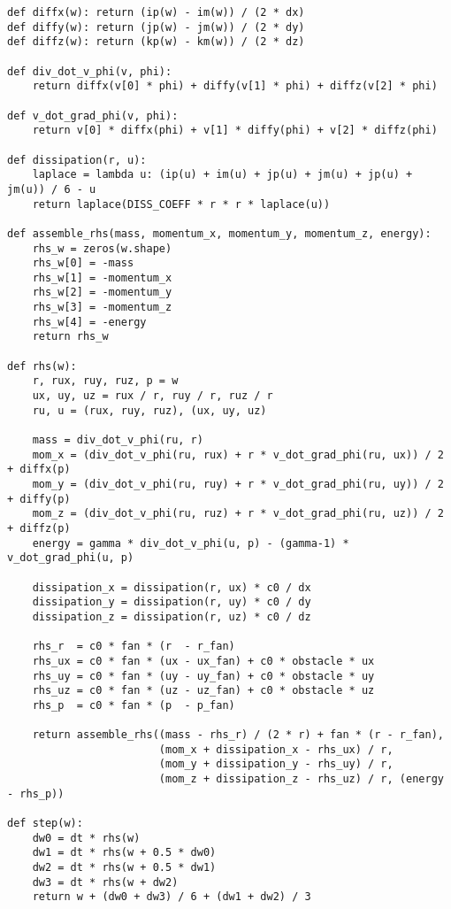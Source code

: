 \documentclass[review]{siamart0216}
\begin{document}
\begin{lstlisting}
def diffx(w): return (ip(w) - im(w)) / (2 * dx)
def diffy(w): return (jp(w) - jm(w)) / (2 * dy)
def diffz(w): return (kp(w) - km(w)) / (2 * dz)

def div_dot_v_phi(v, phi):
    return diffx(v[0] * phi) + diffy(v[1] * phi) + diffz(v[2] * phi)

def v_dot_grad_phi(v, phi):
    return v[0] * diffx(phi) + v[1] * diffy(phi) + v[2] * diffz(phi)

def dissipation(r, u):
    laplace = lambda u: (ip(u) + im(u) + jp(u) + jm(u) + jp(u) + jm(u)) / 6 - u
    return laplace(DISS_COEFF * r * r * laplace(u))

def assemble_rhs(mass, momentum_x, momentum_y, momentum_z, energy):
    rhs_w = zeros(w.shape)
    rhs_w[0] = -mass
    rhs_w[1] = -momentum_x
    rhs_w[2] = -momentum_y
    rhs_w[3] = -momentum_z
    rhs_w[4] = -energy
    return rhs_w

def rhs(w):
    r, rux, ruy, ruz, p = w
    ux, uy, uz = rux / r, ruy / r, ruz / r
    ru, u = (rux, ruy, ruz), (ux, uy, uz)

    mass = div_dot_v_phi(ru, r)
    mom_x = (div_dot_v_phi(ru, rux) + r * v_dot_grad_phi(ru, ux)) / 2 + diffx(p)
    mom_y = (div_dot_v_phi(ru, ruy) + r * v_dot_grad_phi(ru, uy)) / 2 + diffy(p)
    mom_z = (div_dot_v_phi(ru, ruz) + r * v_dot_grad_phi(ru, uz)) / 2 + diffz(p)
    energy = gamma * div_dot_v_phi(u, p) - (gamma-1) * v_dot_grad_phi(u, p)

    dissipation_x = dissipation(r, ux) * c0 / dx
    dissipation_y = dissipation(r, uy) * c0 / dy
    dissipation_z = dissipation(r, uz) * c0 / dz

    rhs_r  = c0 * fan * (r  - r_fan)
    rhs_ux = c0 * fan * (ux - ux_fan) + c0 * obstacle * ux
    rhs_uy = c0 * fan * (uy - uy_fan) + c0 * obstacle * uy
    rhs_uz = c0 * fan * (uz - uz_fan) + c0 * obstacle * uz
    rhs_p  = c0 * fan * (p  - p_fan)

    return assemble_rhs((mass - rhs_r) / (2 * r) + fan * (r - r_fan),
                        (mom_x + dissipation_x - rhs_ux) / r,
                        (mom_y + dissipation_y - rhs_uy) / r,
                        (mom_z + dissipation_z - rhs_uz) / r, (energy - rhs_p))

def step(w):
    dw0 = dt * rhs(w)
    dw1 = dt * rhs(w + 0.5 * dw0)
    dw2 = dt * rhs(w + 0.5 * dw1)
    dw3 = dt * rhs(w + dw2)
    return w + (dw0 + dw3) / 6 + (dw1 + dw2) / 3
\end{lstlisting}
\end{document}
